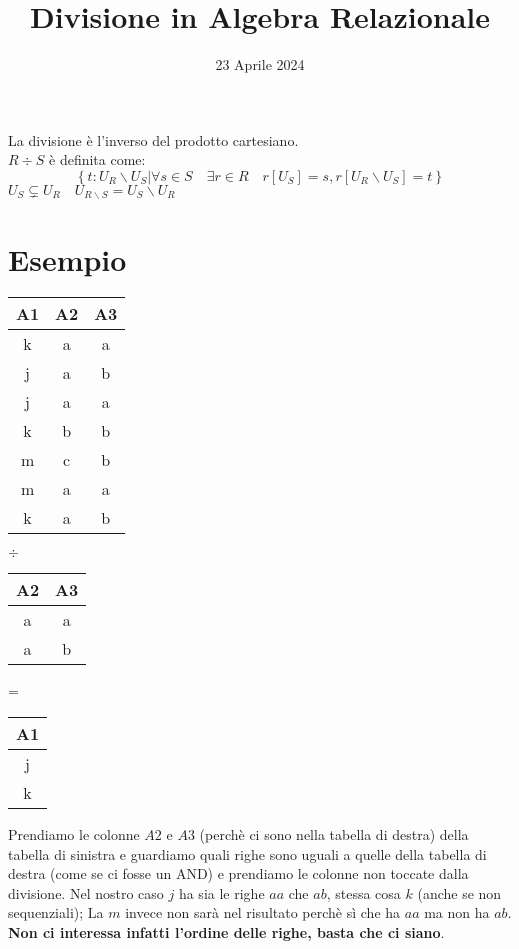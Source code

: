 \documentclass[12pt]{article}
\title{Divisione in Algebra Relazionale}
\date{23 Aprile 2024}
\begin{document}
\maketitle
La divisione è l'inverso del prodotto cartesiano.\\
$R \div S$ è definita come:
\begin{equation*}
    \left\{t:U_{R}\backslash U_{S}|\forall s\in S\quad\exists r\in R\quad r[U_{S}]=s,r[U_{R}\backslash U_{S}]=t\right\}
\end{equation*}
$U_{S}\subsetneq U_{R} \quad U_{R\backslash S}=U_{S}\backslash U_{R}$
\section*{Esempio}
\begin{center}
    \begin{tabular}{|c|c|c|}
        \hline
        A1 & A2 & A3\\
        \hline
        \rowcolor{yellow}
        k & a & a\\
        \hline
        \rowcolor{red}
        j & a & b\\
        \hline
        \rowcolor{red}
        j & a & a\\
        \hline
        k & b & b\\
        \hline
        m & c & b\\
        \hline
        m & a & a\\
        \hline
        \rowcolor{yellow}
        k & a & b \\
        \hline
    \end{tabular}
    $\div$
    \begin{tabular}{|c|c|}
        \hline
        A2 & A3\\
        \hline
        a & a\\
        \hline
        a & b\\
        \hline
    \end{tabular}
    =
    \begin{tabular}{|c|}
        \hline
        A1\\
        \hline
        j\\
        \hline
        k\\
        \hline
    \end{tabular}
\end{center}
Prendiamo le colonne $A2$ e $A3$ (perchè ci sono nella tabella di destra) della tabella di sinistra e guardiamo quali righe sono uguali a quelle della tabella di destra (come se ci fosse un AND) e prendiamo le colonne non toccate dalla divisione. Nel nostro caso $j$ ha sia le righe $aa$ che $ab$, stessa cosa $k$ (anche se non sequenziali); La $m$ invece non sarà nel risultato perchè sì che ha $aa$ ma non ha $ab$. \textbf{Non ci interessa infatti l'ordine delle righe, basta che ci siano}.
\end{document}
